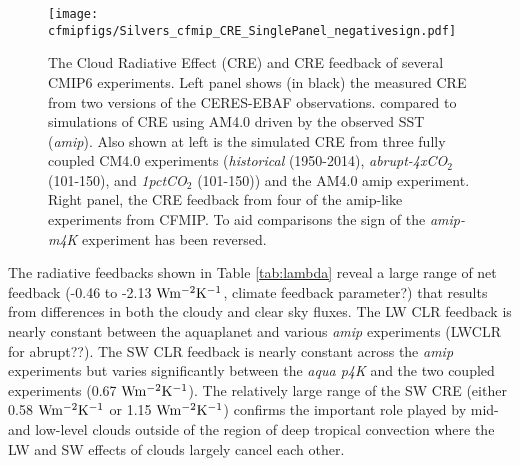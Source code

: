 \documentclass[draft]{agujournal2019}
\begin{document}
\begin{figure}
  \centering
  \texttt{[image: cfmipfigs/Silvers\_cfmip\_CRE\_SinglePanel\_negativesign.pdf]}
  \caption{The Cloud Radiative Effect (CRE) and CRE feedback of several CMIP6 experiments.  Left panel 
  shows (in black) the measured CRE from two versions of the CERES-EBAF observations.   compared to 
  simulations of CRE using AM4.0 driven by the observed SST (\textit{amip}).  Also 
  shown at left is the simulated CRE from three fully coupled CM4.0 experiments (\textit{historical} (1950-2014),
  \textit{abrupt-4xCO$_2$} (101-150), and \textit{1pctCO$_2$} (101-150)) and the AM4.0 amip experiment.  Right panel, the CRE feedback from four 
  of the amip-like experiments from CFMIP.  To aid comparisons the sign of the \textit{amip-m4K} experiment has 
  been reversed.}
  \label{fig:CRE_feedback}
\end{figure}    


%
%

The radiative feedbacks shown in Table \ref{tab:lambda} reveal a large range of net feedback 
(-0.46 to -2.13 $\rm{W m^{-2}K^{-1}}$, climate feedback parameter?) that results from differences in 
both the cloudy and clear sky fluxes.   The LW CLR feedback is nearly constant between the 
aquaplanet and various \textit{amip} experiments (LWCLR for abrupt??).   The SW CLR 
feedback is nearly constant across the \textit{amip} experiments but varies significantly
between the \textit{aqua p4K} and the two coupled experiments (0.67 $\rm{W m^{-2}K^{-1}}$).
The relatively large range of the SW CRE (either 0.58 $\rm{W m^{-2}K^{-1}}$ or 1.15 $\rm{W m^{-2}K^{-1}}$)
confirms the important role played by mid- and low-level clouds outside of the region of 
deep tropical convection where the LW and SW effects of clouds largely cancel each other.  
\end{document}
